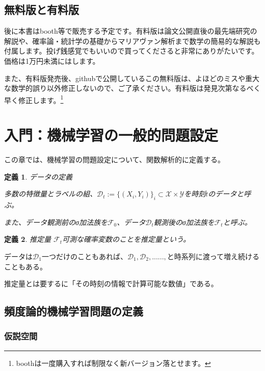 \documentclass{jsarticle}
\newtheorem{defi}{定義}[section]
\begin{document}
\subsection{無料版と有料版}
後に本書はbooth等で販売する予定です。有料版は論文公開直後の最先端研究の解説や、確率論・統計学の基礎からマリアヴァン解析まで数学の簡易的な解説も付属します。投げ銭感覚でもいいので買ってくださると非常にありがたいです。価格は1万円未満にはします。

また、有料版発売後、githubで公開しているこの無料版は、よほどのミスや重大な数学的誤り以外修正しないので、ご了承ください。有料版は発見次第なるべく早く修正します。\footnote{boothは一度購入すれば制限なく新バージョン落とせます。}


\newpage





\section{入門：機械学習の一般的問題設定}

この章では、機械学習の問題設定について、関数解析的に定義する。

\begin{defi} データの定義

多数の特徴量とラベルの組、$\mathcal{D}_t:=\{(X_i,Y_i)\}_i\subset \mathcal{X}\times \mathcal{Y}$を時刻$t$のデータと呼ぶ。

また、データ観測前のσ加法族を$\mathcal{F}_0$、データ$\mathcal{D}_t$観測後のσ加法族を$\mathcal{F}_t$と呼ぶ。


\end{defi}
\begin{defi} 推定量
$\mathcal{F}_t$可測な確率変数のことを推定量という。
\end{defi}

データは$\mathcal{D}_1$一つだけのこともあれば、$\mathcal{D}_1,\mathcal{D}_2,......,$と時系列に渡って増え続けることもある。

推定量とは要するに「その時刻の情報で計算可能な数値」である。

\subsection{頻度論的機械学習問題の定義}



\subsubsection{仮説空間}
\end{document}
